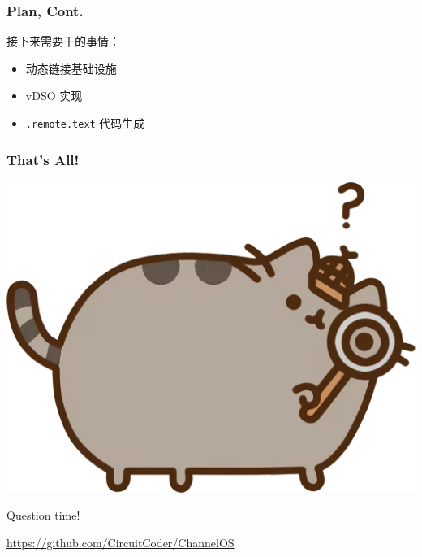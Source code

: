 \documentclass[UTF-8]{ctexbeamer}
\begin{document}
\begin{frame}
  \frametitle{Plan, Cont.}
  接下来需要干的事情：

  \begin{itemize}
    \item 动态链接基础设施
    \item vDSO 实现
    \item \texttt{.remote.text} 代码生成
  \end{itemize}
\end{frame}

\begin{frame}
  \frametitle{That's All!}
  \begin{center}
    \includegraphics[width=.5\textwidth]{assets/look.png}

    Question time!
  \end{center}
  \url{https://github.com/CircuitCoder/ChannelOS}
\end{frame}
\end{document}
